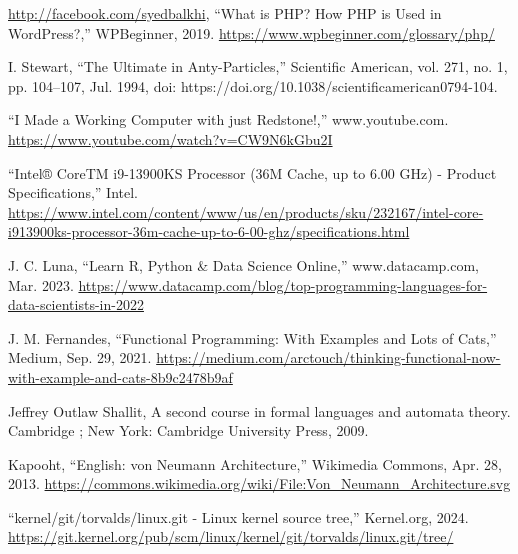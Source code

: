 \documentclass[12pt]{report} %
\begin{document}
\begin{singlespace}
\begin{thebibliography}{}
             \href{http://facebook.com/syedbalkhi}{http://facebook.com/syedbalkhi}, “What is PHP? How PHP is Used in WordPress?,” WPBeginner, 2019. \href{https://www.wpbeginner.com/glossary/php/}{https://www.wpbeginner.com/glossary/php/}
            
             I. Stewart, “The Ultimate in Anty-Particles,” Scientific American, vol. 271, no. 1, pp. 104–107, Jul. 1994, doi: https://doi.org/10.1038/scientificamerican0794-104.
            
             “I Made a Working Computer with just Redstone!,” www.youtube.com. \href{https://www.youtube.com/watch?v=CW9N6kGbu2I}{https://www.youtube.com/watch?v=CW9N6kGbu2I}
            
             “Intel® CoreTM i9-13900KS Processor (36M Cache, up to 6.00 GHz) - Product Specifications,” Intel. \href{https://www.intel.com/content/www/us/en/products/sku/232167/intel-core-i913900ks-processor-36m-cache-up-to-6-00-ghz/specifications.html}{https://www.intel.com/content/www/us/en/products/sku/232167/intel-core-i913900ks-processor-36m-cache-up-to-6-00-ghz/specifications.html}
            
             J. C. Luna, “Learn R, Python \& Data Science Online,” www.datacamp.com, Mar. 2023. \href{https://www.datacamp.com/blog/top-programming-languages-for-data-scientists-in-2022}{https://www.datacamp.com/blog/top-programming-languages-for-data-scientists-in-2022}
            
             J. M. Fernandes, “Functional Programming: With Examples and Lots of Cats,” Medium, Sep. 29, 2021. \href{https://medium.com/arctouch/thinking-functional-now-with-example-and-cats-8b9c2478b9af}{https://medium.com/arctouch/thinking-functional-now-with-example-and-cats-8b9c2478b9af}
            
             Jeffrey Outlaw Shallit, A second course in formal languages and automata theory. Cambridge ; New York: Cambridge University Press, 2009.
            
             Kapooht, “English: von Neumann Architecture,” Wikimedia Commons, Apr. 28, 2013. \href{https://commons.wikimedia.org/wiki/File:Von_Neumann_Architecture.svg}{https://commons.wikimedia.org/wiki/File:Von\_Neumann\_Architecture.svg}
            
             “kernel/git/torvalds/linux.git - Linux kernel source tree,” Kernel.org, 2024. \href{https://git.kernel.org/pub/scm/linux/kernel/git/torvalds/linux.git/tree/}{https://git.kernel.org/pub/scm/linux/kernel/git/torvalds/linux.git/tree/}
            

\end{thebibliography}
\end{singlespace}
\end{document}
